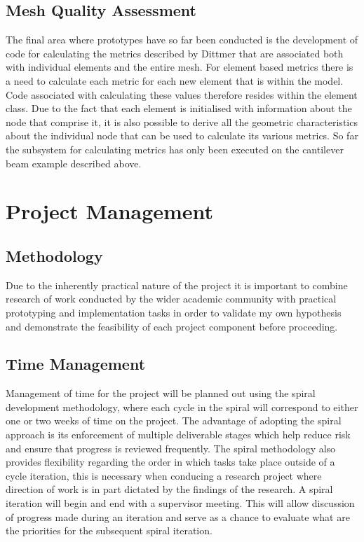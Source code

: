 \documentclass{article}
\begin{document}
\subsection{Mesh Quality Assessment}
The final area where prototypes have so far been conducted is the development of code for calculating the metrics described by Dittmer that are associated both with individual elements and the entire mesh. For element based metrics there is a need to calculate each metric for each new element that is within the model. Code associated with calculating these values therefore resides within the element class. Due to the fact that each element is initialised with information about the node that comprise it, it is also possible to derive all the geometric characteristics about the individual node that can be used to calculate its various metrics. So far the subsystem for calculating metrics has only been executed on the cantilever beam example described above.


\section{Project Management}

\subsection{Methodology}
Due to the inherently practical nature of the project it is important to combine research of work conducted by the wider academic community with practical prototyping and implementation tasks in order to validate my own hypothesis and demonstrate the feasibility of each project component before proceeding.

\subsection{Time Management}
Management of time for the project will be planned out using the spiral development methodology, where each cycle in the spiral will correspond to either one or two weeks of time on the project. The advantage of adopting the spiral approach is its enforcement of multiple deliverable stages which help reduce risk and ensure that progress is reviewed frequently. The spiral methodology also provides flexibility regarding the order in which tasks take place outside of a cycle iteration, this is necessary when conducing a research project where direction of work is in part dictated by the findings of the research.
A spiral iteration will begin and end with a supervisor meeting. This will allow discussion of progress made during an iteration and serve as a chance to evaluate what are the priorities for the subsequent spiral iteration. 
\end{document}
